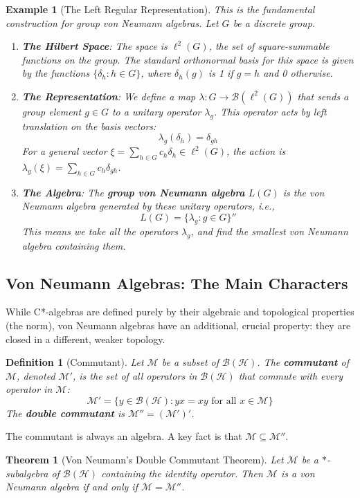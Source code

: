 \documentclass[11pt, a4paper]{article}
\theoremstyle{colored_def}
\newtheorem{definition}{Definition}[section]
\theoremstyle{colored_thm}
\newtheorem{theorem}{Theorem}[section]
\theoremstyle{colored_ex}
\newtheorem{example}{Example}[section]
\newcommand{\M}{\mathcal{M}}
\newcommand{\Hil}{\mathcal{H}}
\newcommand{\B}{\mathcal{B}}
\begin{document}
\begin{example}[The Left Regular Representation]\label{ex:left-reg-rep}
This is the fundamental construction for group von Neumann algebras. Let $G$ be a discrete group.
\begin{enumerate}
    \item \textbf{The Hilbert Space}: The space is $\ell^2(G)$, the set of square-summable functions on the group. The standard orthonormal basis for this space is given by the functions $\{\delta_h : h \in G\}$, where $\delta_h(g)$ is 1 if $g=h$ and 0 otherwise.
    \item \textbf{The Representation}: We define a map $\lambda: G \to \B(\ell^2(G))$ that sends a group element $g \in G$ to a unitary operator $\lambda_g$. This operator acts by left translation on the basis vectors:
    $$ \lambda_g(\delta_h) = \delta_{gh} $$
    For a general vector $\xi = \sum_{h \in G} c_h \delta_h \in \ell^2(G)$, the action is $\lambda_g(\xi) = \sum_{h \in G} c_h \delta_{gh}$.
    \item \textbf{The Algebra}: The \textbf{group von Neumann algebra} $L(G)$ is the von Neumann algebra generated by these unitary operators, i.e.,
    $$ L(G) = \{ \lambda_g : g \in G \}'' $$
    This means we take all the operators $\lambda_g$, and find the smallest von Neumann algebra containing them.
\end{enumerate}
\end{example}

\subsection{Von Neumann Algebras: The Main Characters}

While C*-algebras are defined purely by their algebraic and topological properties (the norm), von Neumann algebras have an additional, crucial property: they are closed in a different, weaker topology.

\begin{definition}[Commutant]
Let $\M$ be a subset of $\B(\Hil)$. The \textbf{commutant} of $\M$, denoted $\M'$, is the set of all operators in $\B(\Hil)$ that commute with every operator in $\M$:
$$ \M' = \{ y \in \B(\Hil) : yx = xy \text{ for all } x \in \M \} $$
The \textbf{double commutant} is $\M'' = (\M')'$.
\end{definition}

The commutant is always an algebra. A key fact is that $\M \subseteq \M''$.

\begin{theorem}[Von Neumann's Double Commutant Theorem]
Let $\M$ be a $*$-subalgebra of $\B(\Hil)$ containing the identity operator. Then $\M$ is a von Neumann algebra if and only if $\M = \M''$.
\end{theorem}
\end{document}
